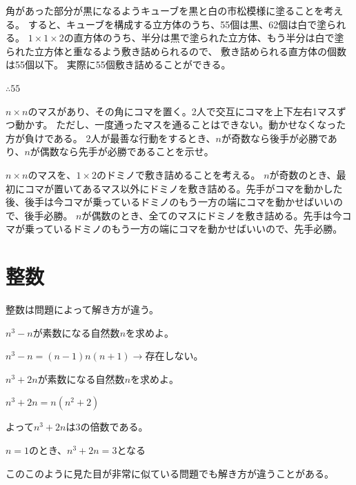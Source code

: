 \documentclass[uplatex,dvipdfmx]{jsbook}
\begin{document}
\begin{answer}
    角があった部分が黒になるようキューブを黒と白の市松模様に塗ることを考える。
    すると、キューブを構成する立方体のうち、55個は黒、62個は白で塗られる。
    $1 \times 1 \times 2$の直方体のうち、半分は黒で塗られた立方体、もう半分は白で塗られた立方体と重なるよう敷き詰められるので、
    敷き詰められる直方体の個数は55個以下。
    実際に55個敷き詰めることができる。

    $\therefore 55$
\end{answer}

\begin{problem}[練習問題2]
    $n \times n$のマスがあり、その角にコマを置く。2人で交互にコマを上下左右1マスずつ動かす。
    ただし、一度通ったマスを通ることはできない。動かせなくなった方が負けである。
    2人が最善な行動をするとき、$n$が奇数なら後手が必勝であり、$n$が偶数なら先手が必勝であることを示せ。
\end{problem}

\begin{answer}
    $n \times n$のマスを、$1\times 2$のドミノで敷き詰めることを考える。
    $n$が奇数のとき、最初にコマが置いてあるマス以外にドミノを敷き詰める。先手がコマを動かした後、後手は今コマが乗っているドミノのもう一方の端にコマを動かせばいいので、後手必勝。
    $n$が偶数のとき、全てのマスにドミノを敷き詰める。先手は今コマが乗っているドミノのもう一方の端にコマを動かせばいいので、先手必勝。
\end{answer}

\chapter{整数}
整数は問題によって解き方が違う。
\begin{problem}[例1]
    $n^3-n$が素数になる自然数$n$を求めよ。

    $n^3-n=\left(n-1\right)n\left(n+1\right)\rightarrow$存在しない。
\end{problem}

\begin{problem}[例2]

    $n^3+2n$が素数になる自然数$n$を求めよ。

    $n^3+2n=n\left(n^2+2\right)$

    よって$n^3+2n$は$3$の倍数である。

    $n=1$のとき、$n^3+2n=3$となる
\end{problem}

このこのように見た目が非常に似ている問題でも解き方が違うことがある。
\end{document}
